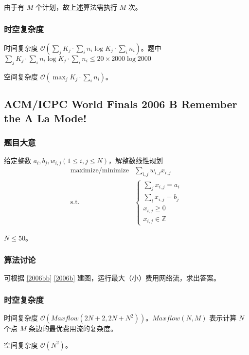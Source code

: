 				由于有 $M$ 个计划，故上述算法需执行 $M$ 次。
			
			\subsubsection{时空复杂度}
				时间复杂度 $\mathcal{O}\left(\sum_j K_j \cdot \sum_i n_i \log K_j \cdot \sum_i n_i \right)$。题中 $\sum_j K_j \cdot \sum_i n_i \log K_j \cdot \sum_i n_i  \le 20 \times \num{2000} \log \num{2000}$
					
				空间复杂度 $\mathcal{O}\left( \max_j K_j \cdot \sum_i n_i\right)$。

		\newpage
		\subsection{ACM/ICPC World Finals 2006 B Remember the A La Mode!}
			\subsubsection{题目大意}
				给定整数 $a_i, b_j, w_{i, j} (1 \le i, j \le N)$，解整数线性规划
				\begin{align}
					\text{maximize/minimize} & \sum_{i,j} w_{i,j}x_{i,j}   \label{2006bb} \\
					\text{s.t.} & \begin{cases}
						\sum_{j} x_{i, j} = a_i\\
						\sum_{i} x_{i, j} = b_j\\
								x_{i, j} \ge 0\\
								x_{i, j} \in \mathbb{Z}
					\end{cases} \label{2006b}
				\end{align}
				
				$N \le 50$。
			\subsubsection{算法讨论}
				可根据 \eqref{2006bb} \eqref{2006b} 建图，运行最大（小）费用网络流，求出答案。
			\subsubsection{时空复杂度}
				
				时间复杂度 $\mathcal{O}\left(Maxflow(2N+2, 2N+N^2)\right)$。$Maxflow(N, M)$ 表示计算 $N$ 个点 $M$ 条边的最优费用流的复杂度。
					
				空间复杂度 $\mathcal{O}\left(N^2\right)$。
			
		\newpage
